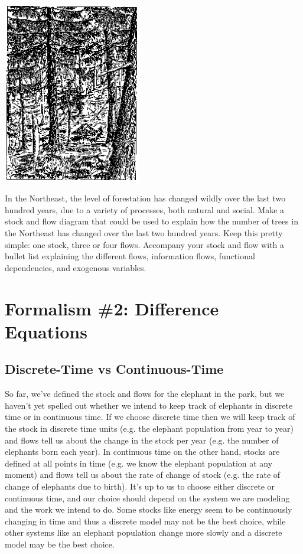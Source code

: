 \begin{marginfigure}
\includegraphics[width=6cm]{figs/forest}
\end{marginfigure}
In the Northeast, the level of forestation has changed wildly over the last two hundred years, due to a variety of processes, both natural and social.   Make a stock and flow diagram that could be used to explain how the number of trees in the Northeast has changed over the last two hundred years.  Keep this pretty simple:  one stock, three or four flows.  Accompany your stock and flow with a bullet list explaining the different flows, information flows, functional dependencies, and exogenous variables.

\section{Formalism \#2: Difference Equations}

\subsection{Discrete-Time vs Continuous-Time}

So far, we've defined the stock and flows for the elephant in the park, but we haven't yet spelled out whether we intend to keep track of elephants in discrete time or in continuous time. If we choose discrete time then we will keep track of the stock in discrete time units (e.g. the elephant population from year to year) and flows tell us about the change in the stock per year (e.g. the number of elephants born each year). In continuous time on the other hand, stocks are defined at all points in time (e.g. we know the elephant population at any moment) and flows tell us about the rate of change of stock (e.g. the rate of change of elephants due to birth). It's up to us to choose either discrete or continuous time, and our choice should depend on the system we are modeling and the work we intend to do. Some stocks like energy seem to be continuously changing in time and thus a discrete model may not be the best choice, while other systems like an elephant population change more slowly and a discrete model may be the best choice.  

